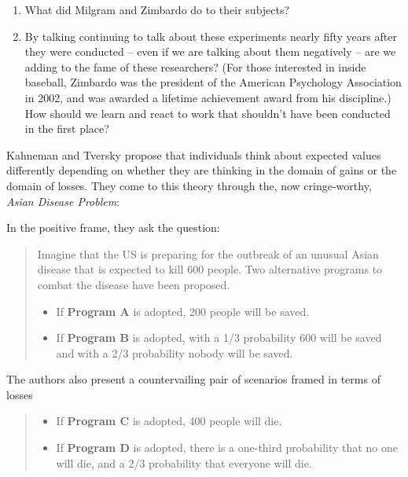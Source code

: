 \documentclass[
]{article}
\providecommand{\tightlist}{%
  \setlength{\itemsep}{0pt}\setlength{\parskip}{0pt}}
\theoremstyle{definition}
\theoremstyle{definition}
\theoremstyle{definition}
\theoremstyle{definition}
\theoremstyle{remark}
\begin{document}
\begin{enumerate}
\def\labelenumi{\arabic{enumi}.}
\tightlist
\item
  What did Milgram and Zimbardo do to their subjects?
\item
  By talking continuing to talk about these experiments nearly fifty years after they were conducted -- even if we are talking about them negatively -- are we adding to the fame of these researchers? (For those interested in inside baseball, Zimbardo was the president of the American Psychology Association in 2002, and was awarded a lifetime achievement award from his discipline.) How should we learn and react to work that shouldn't have been conducted in the first place?
\end{enumerate}

Kahneman and Tversky propose that individuals think about expected values differently depending on whether they are thinking in the domain of gains or the domain of losses. They come to this theory through the, now cringe-worthy, \emph{Asian Disease Problem}:

In the positive frame, they ask the question:

\begin{quote}
Imagine that the US is preparing for the outbreak of an unusual Asian disease that is expected to kill 600 people. Two alternative programs to combat the disease have been proposed.

\begin{itemize}
\tightlist
\item
  If \textbf{Program A} is adopted, 200 people will be saved.
\item
  If \textbf{Program B} is adopted, with a 1/3 probability 600 will be saved and with a 2/3 probability nobody will be saved.
\end{itemize}
\end{quote}

The authors also present a countervailing pair of scenarios framed in terms of losses

\begin{quote}
\begin{itemize}
\tightlist
\item
  If \textbf{Program C} is adopted, 400 people will die.
\item
  If \textbf{Program D} is adopted, there is a one-third probability that no one will die, and a 2/3 probability that everyone will die.
\end{itemize}
\end{quote}
\end{document}
